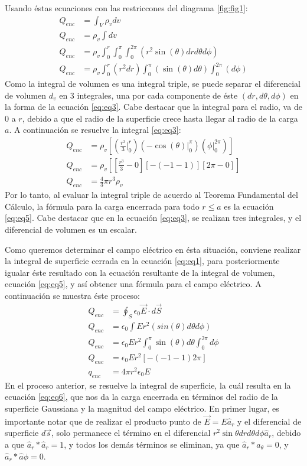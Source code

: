 \documentclass[12pt, letterpaper]{report}
\begin{document}
Usando éstas ecuaciones con las restriccones del diagrama \ref{fig:fig1}: 
\begin{align}
Q_{enc} &= \int_V \rho_v dv \\
Q_{enc} &= \rho_v \int dv \\ 
Q_{enc} &= \rho_v \int_{0}^{r}\int_{0}^{\pi}\int_{0}^{2\pi}(r^2\sin(\theta)dr d\theta d\phi) \label{eq:eq3} \\ 
Q_{enc} &= \rho_v\int_{0}^{r}(r^2dr)\int_{0}^{\pi}(\sin(\theta)d\theta) \int_{0}^{2\pi}(d\phi) \label{eq:eq4}
\end{align}
Como la integral de volumen es una integral triple, se puede separar el diferencial de volumen $d_v$ en 3 integrales, una por cada 
componente de éste $(dr, d\theta, d\phi)$ en la forma de la ecuación \ref{eq:eq3}. Cabe destacar que la integral para el radio, va de $0$ a 
$r$, debido a que el radio de la superficie crece hasta llegar al radio de la carga $a$. A continuación se resuelve la integral \ref{eq:eq3}: 
\begin{align}
Q_{enc} &= \rho_v[(\frac{r^3}{3}\Big |_0^r)(-\cos(\theta)\Big |_0^\pi)(\phi \Big|_0^{2\pi})]\\
Q_{enc} &= \rho_v[[\frac{r^3}{3}-0][-(-1-1)][2\pi - 0]] \\ 
Q_{enc} &= \frac{4}{3}\pi r^3 \rho_v \label{eq:eq5}
\end{align}
Por lo tanto, al evaluar la integral triple de acuerdo al Teorema Fundamental del Cálculo, la fórmula para la carga encerrada para todo $r\leq a$ es la ecuación 
\ref{eq:eq5}. Cabe destacar que en la ecuación \ref{eq:eq3}, se realizan tres integrales, y el diferencial de volumen es un escalar. 

Como queremos determinar el campo eléctrico en ésta situación, conviene realizar la integral de superficie cerrada en la ecuación \ref{eq:eq1}, para posteriormente igualar éste resultado con 
la ecuación resultante de la integral de volumen, ecuación \ref{eq:eq5}, y así obtener una fórmula para el campo eléctrico. A continuación se muestra éste proceso:
\begin{align}
Q_{enc} &= \oint _S \epsilon_0 \vec{E} \cdot d \vec{S} \\
Q_{enc} &= \epsilon_0 \int Er^2(sin(\theta)d\theta d\phi) \\ 
Q_{enc} &= \epsilon_0 Er^2 \int_{0}^{\pi} \sin(\theta) d\theta \int_{0}^{2\pi} d\phi \\ 
Q_{enc} &= \epsilon_0 Er^2 [-(-1-1)2\pi]\\
q_{enc} &= 4\pi r^2 \epsilon_0 E \label{eq:eq6}
\end{align} 
En el proceso anterior, se resuelve la integral de superficie, la cuál resulta en la ecuación \ref{eq:eq6}, que nos da 
la carga encerrada en términos del radio de la superficie Gaussiana y la magnitud del campo eléctrico. En primer lugar, es importante notar que 
de realizar el producto punto de $\vec{E} = E\hat{a}_r$ y el diferencial de superficie 
$d\vec{s}$, solo permanece el término en el diferencial $r^2\sin\theta dr d\theta d \phi \hat{a}_r$, debido a que $ \hat{a}_r *  \hat{a}_r = 1$, y todos los demás términos 
se eliminan, ya que $ \hat{a}_r *  \hat{a}_\theta = 0$, y $ \hat{a}_r * \hat{a}\phi = 0$. \\ 
\end{document}

